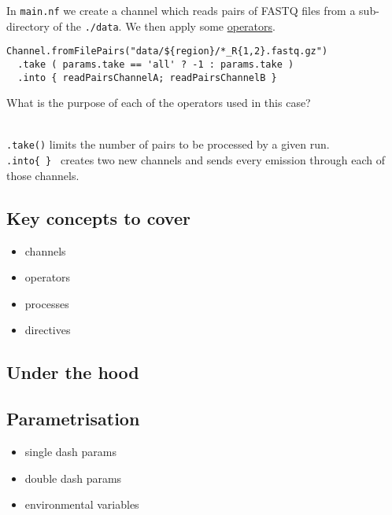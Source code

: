 \begin{questions}
In \texttt{main.nf} we create a channel which reads pairs of FASTQ files from a sub-directory of the \texttt{./data}. We then apply some \href{https://www.nextflow.io/docs/latest/operator.html}{operators}. 
\begin{verbatim}
Channel.fromFilePairs("data/${region}/*_R{1,2}.fastq.gz")
  .take ( params.take == 'all' ? -1 : params.take ) 
  .into { readPairsChannelA; readPairsChannelB } 
\end{verbatim}
What is the purpose of each of the operators used in this case? 
\begin{answer}
\\\texttt{.take()} limits the number of pairs to be processed by a given run. 
\\\texttt{.into\{ \} } creates two new channels and sends every emission through each of those channels.
\end{answer}

\end{questions}




\subsection{Key concepts to cover}

\begin{itemize}
 \item channels
 \item operators
 \item processes
 \item directives
\end{itemize}

\subsection {Under the hood}



\subsection{Parametrisation}

\begin{itemize}
 \item single dash params
 \item double dash params
 \item environmental variables
\end{itemize}

